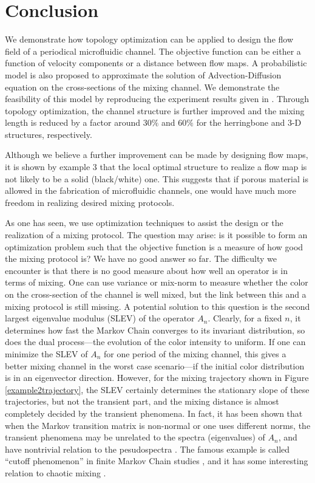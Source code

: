 %
%
\section{Conclusion}
\label{sec:topoptconclusion}

We demonstrate how topology optimization can be applied to design the
flow field of a periodical microfluidic channel. The objective
function can be either a function of velocity components or a distance
between flow maps. A probabilistic model is also proposed to
approximate the solution of Advection-Diffusion equation on the
cross-sections of the mixing channel. We demonstrate the feasibility
of this model by reproducing the experiment results given in
\cite{Stroock2002}. Through topology optimization, the channel
structure is further improved and the mixing length is reduced by a
factor around $30\%$ and $60\%$ for the herringbone and $3$-D
structures, respectively.

Although we believe a further improvement can be made by designing
flow maps, it is shown by example $3$ that the local optimal structure
to realize a flow map is not likely to be a solid (black/white) one.
This suggests that if porous material is allowed in the fabrication of
microfluidic channels, one would have much more freedom in realizing
desired mixing protocols.

As one has seen, we use optimization techniques to assist the design or the realization of a mixing
protocol. The question may arise: is it possible to form an optimization problem such that the
objective function is a measure of how good the mixing protocol is? We have no good answer so far.
The difficulty we encounter is that there is no good measure about how well an operator is in terms
of mixing. One can use variance or mix-norm \cite{Mezic2005} to measure whether the color on the
cross-section of the channel is well mixed, but the link between this and a mixing protocol is
still missing. A potential solution to this question is the second largest eigenvalue
modulus (SLEV) \cite{Boyd2004} of the operator $A_n$. Clearly, for a fixed $n$, it determines how
fast the Markov Chain converges to its invariant distribution, so does the dual process---the
evolution of the color intensity to uniform. If one can minimize the SLEV of $A_n$ for one period of
the mixing channel, this gives a better mixing channel in the worst case scenario---if the initial color distribution is in an eigenvector direction. However, for the mixing trajectory shown in Figure \ref{example2trajectory}, the SLEV certainly determines the stationary slope of these trajectories, but not the transient part, and the mixing distance is almost completely decided by the transient phenomena. In fact, it has been shown that when the Markov transition matrix is non-normal or one uses different norms, the transient phenomena may be unrelated to the spectra (eigenvalues) of $A_n$, and have nontrivial relation to the pesudospectra \cite{Lloyd2005}. The famous example is called ``cutoff phenomenon'' in finite Markov Chain studies \cite{Diaconis1996, Diaconis2005, LSaloff-Costt2004}, and it has some interesting relation to chaotic mixing \cite{numcutoff, symdyn}.


